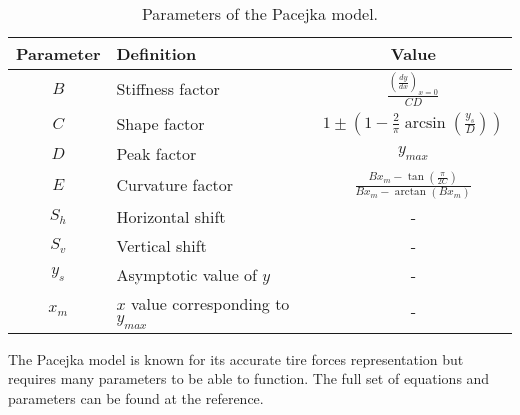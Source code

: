 \documentclass[journal]{IEEEtran}
\begin{document}
\begin{table}
  \centering
      \caption{Parameters of the Pacejka model.}
  \begin{adjustbox}{width=\columnwidth}
    \begin{tabular}{cp{}c}
      \toprule
      \textbf{Parameter} & \textbf{Definition} &\textbf{Value}\\
      \midrule
      $B$ & Stiffness factor & $\frac{\left (\frac{dy}{dx} \right)_{x=0}}{CD}$ \\ [10pt]
      $C$ & Shape factor & $1\pm(1-\frac{2}{\pi}\arcsin(\frac{y_s}{D}))$ \\ [10pt]
      $D$ & Peak factor & $y_{max}$\\ [10pt]
      $E$ & Curvature factor & $\frac{Bx_m-\tan(\frac{\pi}{2C})}{Bx_m-\arctan(Bx_m)}$ \\ [10pt]
      $S_h$ & Horizontal shift & - \\ [10pt]
      $S_v$ & Vertical shift & - \\ [10pt]
      $y_s$ & Asymptotic value of $y$ & - \\ [10pt]
      $x_m$ & $x$ value corresponding to $y_{max}$ & - \\ [10pt]
      \bottomrule
    \end{tabular}
     \end{adjustbox}    

\label{pacejkaParameters.tab}
\end{table}

The Pacejka model is known for its accurate tire forces representation but requires many parameters to be able to function. The full set of equations and parameters can be found at the reference. 
\end{document}
